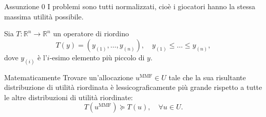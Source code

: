 \documentclass{beamer}
\begin{document}
\begin{frame}
	\begin{block}{Assunzione 0}
		I problemi sono tutti normalizzati, cioè i giocatori hanno la stessa massima utilità possibile.
	\end{block}
	Sia $T: \mathbb{R}^n \rightarrow \mathbb{R}^n$ un operatore di riordino
	\begin{equation*}
		T(y) = (y_{(1)}, \dots, y_{(n)}), \quad y_{(1)} \le \dots \le y_{(n)},
	\end{equation*}
	dove $y_{(i)}$ è l'$i$-esimo elemento più piccolo di $y$. 
	\begin{block}{Matematicamente}
		Trovare un'allocazione $u^{\text{MMF}} \in U$ tale che la sua risultante distribuzione di utilità riordinata è lessicograficamente più grande rispetto a tutte le altre distribuzioni di utilità riordinate:
		\vspace{-0.4cm}
		\begin{equation}
			T(u^{\text{MMF}}) \succeq T(u), \quad \forall u \in U.
		\end{equation}
		\vspace{-0.5cm}
	\end{block}
\end{frame}
\end{document}
